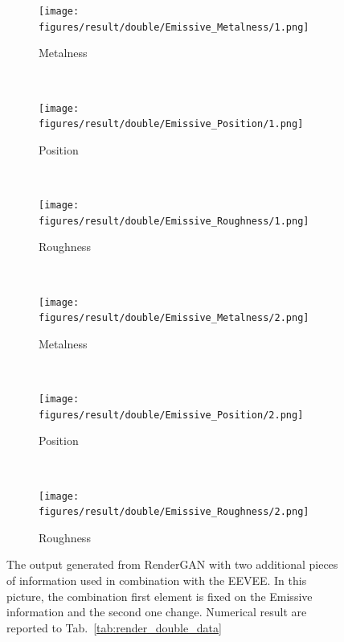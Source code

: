 \begin{figure}[h!]
    \centering
    \begin{subfigure}[b]{0.175\textwidth}
     \texttt{[image: figures/result/double/Emissive\_Metalness/1.png]}
     \caption{Metalness}\label{subfig:1}
    \end{subfigure}
    ~
    \begin{subfigure}[b]{0.175\textwidth}
     \texttt{[image: figures/result/double/Emissive\_Position/1.png]}
     \caption{Position}
    \end{subfigure}
    ~
    \begin{subfigure}[b]{0.175\textwidth}
     \texttt{[image: figures/result/double/Emissive\_Roughness/1.png]}
     \caption{Roughness}
    \end{subfigure}
    \\ \vspace{0.2cm} %
    \begin{subfigure}[b]{0.175\textwidth}
     \texttt{[image: figures/result/double/Emissive\_Metalness/2.png]}
     \caption{Metalness}\label{subfig:1}
    \end{subfigure}
    ~
    \begin{subfigure}[b]{0.175\textwidth}
     \texttt{[image: figures/result/double/Emissive\_Position/2.png]}
     \caption{Position}
    \end{subfigure}
    ~
    \begin{subfigure}[b]{0.175\textwidth}
     \texttt{[image: figures/result/double/Emissive\_Roughness/2.png]}
     \caption{Roughness}
    \end{subfigure}
    \caption[Generation Result with fixed input on Emissive]{The output generated from RenderGAN with two additional pieces of information used in combination with the EEVEE. In this picture, the combination first element is fixed on the Emissive information and the second one change. Numerical result are reported to Tab.~\ref{tab:render_double_data}}
    \label{fig:double_input_base_emissive_generation}
\end{figure}

